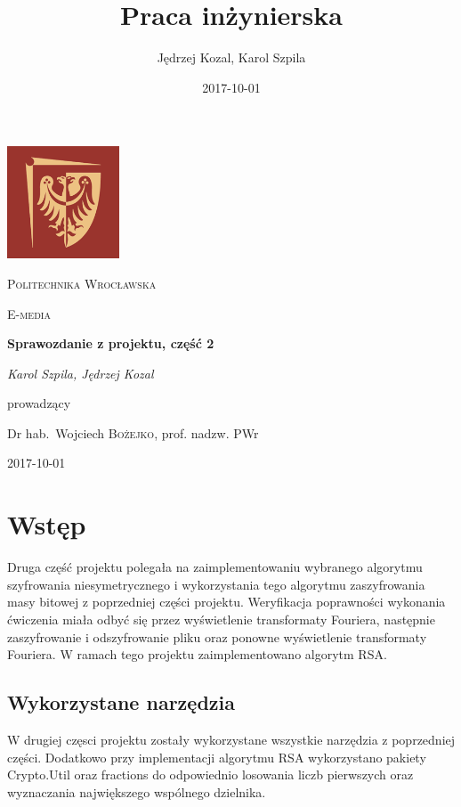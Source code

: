 \documentclass{article}
\title{Praca inżynierska}
\date{2017-10-01}
\author{Jędrzej Kozal, Karol Szpila}
\begin{document}
\begin{titlepage}
	\centering
	\includegraphics[width=0.25\textwidth]{logo_pol_wroclaw.png}\par\vspace{1cm}
	{\scshape\LARGE Politechnika Wrocławska \par}
	\vspace{1cm}
	{\scshape\Large E-media\par}
	\vspace{1.5cm}
	{\huge\bfseries Sprawozdanie z projektu, część 2 \par}
	\vspace{2cm}
	{\Large\itshape Karol Szpila, Jędrzej Kozal\par}
	\vfill
	prowadzący\par
	Dr hab.~Wojciech \textsc{Bożejko}, prof. nadzw. PWr

	\vfill

	{\large 2017-10-01\par}
\end{titlepage}

\section{Wstęp}
Druga część projektu polegała na zaimplementowaniu wybranego algorytmu szyfrowania niesymetrycznego i wykorzystania tego algorytmu zaszyfrowania masy bitowej z poprzedniej części projektu. Weryfikacja poprawności wykonania ćwiczenia miała odbyć się przez wyświetlenie transformaty Fouriera, następnie zaszyfrowanie i odszyfrowanie pliku oraz ponowne wyświetlenie transformaty Fouriera. W ramach tego projektu zaimplementowano algorytm RSA.

\subsection{Wykorzystane narzędzia}
W drugiej częsci projektu zostały wykorzystane wszystkie narzędzia z poprzedniej części. Dodatkowo przy implementacji algorytmu RSA wykorzystano pakiety Crypto.Util oraz fractions do odpowiednio losowania liczb pierwszych oraz wyznaczania największego wspólnego dzielnika.
\end{document}
